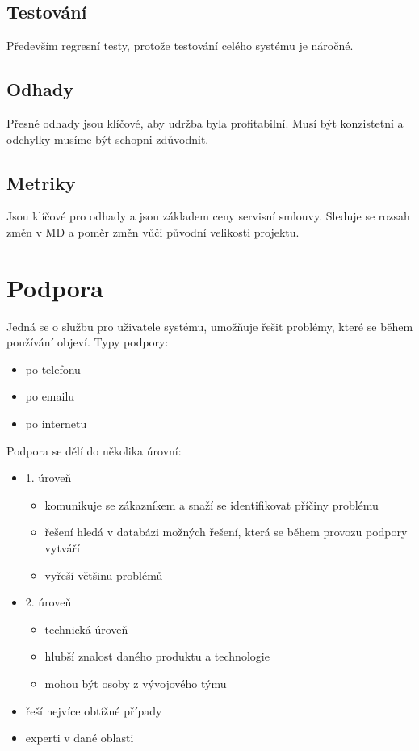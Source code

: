\documentclass{szzclass}
\begin{document}
\subsection{Testování}
Především regresní testy, protože testování celého systému je náročné.
\subsection{Odhady}
Přesné odhady jsou klíčové, aby udržba byla profitabilní. Musí být konzistetní a odchylky musíme být schopni zdůvodnit.
\subsection{Metriky}
Jsou klíčové pro odhady a jsou základem ceny servisní smlouvy. Sleduje se rozsah změn v MD a poměr změn vůči původní velikosti projektu.

\section{Podpora}
Jedná se o službu pro uživatele systému, umožňuje řešit problémy, které se během používání objeví.
Typy podpory:
\begin{itemize}
    \item po telefonu
    \item po emailu
    \item po internetu
\end{itemize}
Podpora se dělí do několika úrovní:
\begin{itemize}
    \item 1. úroveň
    \begin{itemize}
        \item komunikuje se zákazníkem a snaží se identifikovat příčiny problému
        \item řešení hledá v databázi možných řešení, která se během provozu podpory vytváří
        \item vyřeší většinu problémů
    \end{itemize}
    \item 2. úroveň
    \begin{itemize}
        \item technická úroveň
        \item hlubší znalost daného produktu a technologie
        \item mohou být osoby z vývojového týmu
    \end{itemize}
    \item řeší nejvíce obtížné případy
    \item experti v dané oblasti
\end{itemize}
\end{document}
